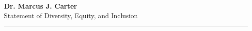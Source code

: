 \documentclass[11pt,letterpaper]{article}
\begin{document}
\begin{center}
    {\sffamily\Huge\bfseries\color{accent} Dr. Marcus J. Carter} \\
    \vspace{0.4em}
    {\sffamily\Large\color{textdark!80} Statement of Diversity, Equity, and Inclusion} \\
    \vspace{0.6em}
    {\color{divider}\rule{0.3\linewidth}{1.2pt}}
\end{center}
\vspace{1.5em}





\end{document}
